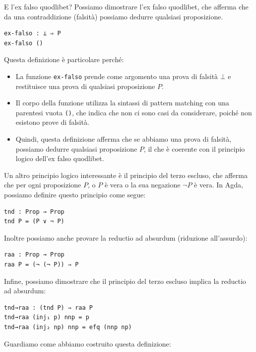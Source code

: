 \documentclass[a4paper]{article}
\theoremstyle{definition}
\theoremstyle{remark}
\begin{document}
E l'ex falso quodlibet?
Possiamo dimostrare l'ex falso quodlibet, che afferma che da una contraddizione (falsità) possiamo dedurre qualsiasi proposizione.
\begin{verbatim}
ex-falso : ⊥ ⇒ P
ex-falso ()
\end{verbatim}
Questa definizione è particolare perché:
\begin{itemize}
  \item La funzione \texttt{ex-falso} prende come argomento una prova di falsità \( ⊥ \) e restituisce una prova di qualsiasi proposizione \( P \).
  \item Il corpo della funzione utilizza la sintassi di pattern matching con una parentesi vuota \texttt{()}, che indica che non ci sono casi da considerare, poiché non esistono prove di falsità.
  \item Quindi, questa definizione afferma che se abbiamo una prova di falsità, possiamo dedurre qualsiasi proposizione \( P \), il che è coerente con il principio logico dell'ex falso quodlibet.
\end{itemize}
Un altro principio logico interessante è il principio del terzo escluso, che afferma che per ogni proposizione \( P \), o \( P \) è vera o la sua negazione \( \neg P \) è vera.
In Agda, possiamo definire questo principio come segue:
\begin{verbatim}
tnd : Prop → Prop
tnd P = (P ∨ ¬ P)
\end{verbatim}
Inoltre possiamo anche provare la reductio ad absurdum (riduzione all'assurdo):
\begin{verbatim}
raa : Prop → Prop
raa P = (¬ (¬ P)) ⇒ P
\end{verbatim}
Infine, possiamo dimostrare che il principio del terzo escluso implica la reductio ad absurdum:
\begin{verbatim}
tnd→raa : (tnd P) ⇒ raa P
tnd→raa (inj₁ p) nnp = p
tnd→raa (inj₂ np) nnp = efq (nnp np) 
\end{verbatim}
Guardiamo come abbiamo costruito questa definizione:
\end{document}
